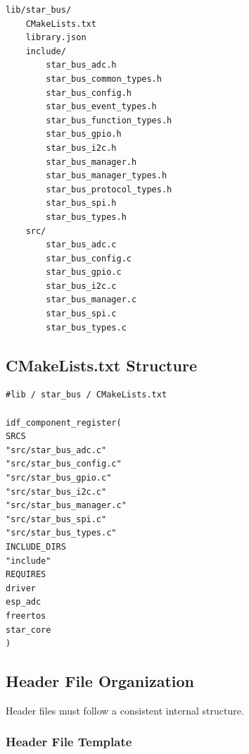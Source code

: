 \begin{verbatim}
lib/star_bus/
    CMakeLists.txt
    library.json
    include/
        star_bus_adc.h
        star_bus_common_types.h
        star_bus_config.h
        star_bus_event_types.h
        star_bus_function_types.h
        star_bus_gpio.h
        star_bus_i2c.h
        star_bus_manager.h
        star_bus_manager_types.h
        star_bus_protocol_types.h
        star_bus_spi.h
        star_bus_types.h
    src/
        star_bus_adc.c
        star_bus_config.c
        star_bus_gpio.c
        star_bus_i2c.c
        star_bus_manager.c
        star_bus_spi.c
        star_bus_types.c
\end{verbatim}

\subsection{CMakeLists.txt Structure}

\begin{lstlisting}
#lib / star_bus / CMakeLists.txt

idf_component_register(
SRCS
"src/star_bus_adc.c"
"src/star_bus_config.c"
"src/star_bus_gpio.c"
"src/star_bus_i2c.c"
"src/star_bus_manager.c"
"src/star_bus_spi.c"
"src/star_bus_types.c"
INCLUDE_DIRS
"include"
REQUIRES
driver
esp_adc
freertos
star_core
)
\end{lstlisting}

\subsection{Header File Organization}

Header files must follow a consistent internal structure.

\subsubsection{Header File Template}

